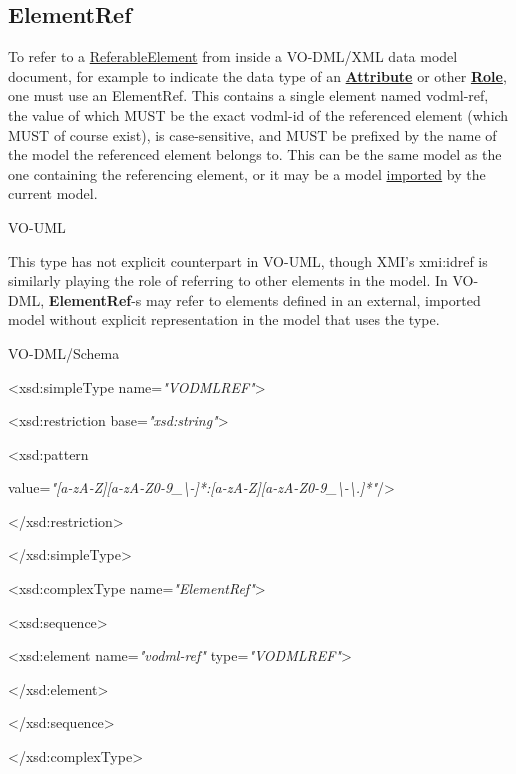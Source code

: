 \documentclass[10pt,a4paper]{ivoa}
\begin{document}
\hypertarget{elementref}{%
\subsection{ElementRef}\label{elementref}}

To refer to a \protect\hyperlink{referableelement}{ReferableElement}
from inside a VO-DML/XML data model document, for example to indicate
the data type of an
\protect\hyperlink{attribute-extends-role}{\textbf{Attribute}} or other
\protect\hyperlink{role-extends-referableelement}{\textbf{Role}}, one
must use an ElementRef. This contains a single element named vodml-ref,
the value of which MUST be the exact vodml-id of the referenced element
(which MUST of course exist), is case-sensitive, and MUST be prefixed by
the name of the model the referenced element belongs to. This can be the
same model as the one containing the referencing element, or it may be a
model \protect\hyperlink{modelimport}{imported} by the current model.

VO-UML

This type has not explicit counterpart in VO-UML, though XMI's xmi:idref
is similarly playing the role of referring to other elements in the
model. In VO-DML, \textbf{ElementRef}-s may refer to elements defined in
an external, imported model without explicit representation in the model
that uses the type.

VO-DML/Schema

\textless xsd:simpleType name=\emph{"VODMLREF"}\textgreater{}

\textless xsd:restriction base=\emph{"xsd:string"}\textgreater{}

\textless xsd:pattern

value=\emph{"{[}a-zA-Z{]}{[}a-zA-Z0-9\_\textbackslash-{]}*:{[}a-zA-Z{]}{[}a-zA-Z0-9\_\textbackslash-\textbackslash.{]}*"}/\textgreater{}

\textless/xsd:restriction\textgreater{}

\textless/xsd:simpleType\textgreater{}

\textless xsd:complexType name=\emph{"ElementRef"}\textgreater{}

\textless xsd:sequence\textgreater{}

\textless xsd:element name=\emph{"vodml-ref"}
type=\emph{"VODMLREF"}\textgreater{}

\textless/xsd:element\textgreater{}

\textless/xsd:sequence\textgreater{}

\textless/xsd:complexType\textgreater{}
\end{document}

